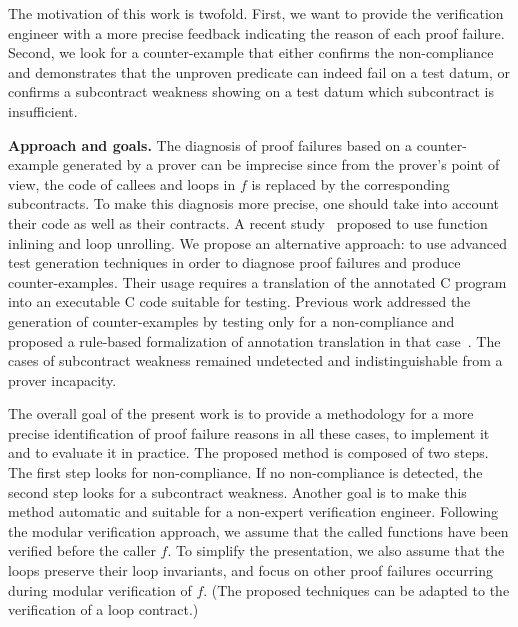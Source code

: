 \documentclass[web]{frama-c-book}
\begin{document}
The motivation of this work is twofold. First, we want to provide the
verification engineer with a more precise feedback indicating the reason of each
proof failure. Second, we look for a counter-example that either confirms the
non-compliance and demonstrates that the unproven predicate can indeed fail on a
test datum, or confirms a subcontract weakness
showing on a test datum which subcontract is insufficient.

\textbf{Approach and goals.}
The diagnosis of proof failures 
based on a counter-example generated by a prover can be imprecise
since from the prover's point of view,
the code of callees and loops in $f$ is replaced by the corresponding
subcontracts.
To make this diagnosis more precise, one should  
take into account their code as well as their contracts.
A recent study~\cite{Tschannen/14} proposed to use function inlining and loop unrolling.
We propose an alternative approach: to
use advanced test generation techniques in order to diagnose 
proof failures and produce counter-examples.
Their usage requires a translation of the annotated
C program
into an executable C code suitable for testing.
Previous work
addressed the generation of counter-examples by testing only for a
non-compli\-ance \cite{Petiot/TAP14} and proposed a rule-based formalization of
annotation translation
in that case~\cite{Petiot/SCAM14}.
The cases of subcontract weakness remained undetected and indistinguishable from
a prover incapacity.

The overall goal of the present work is to provide a methodology for a more
precise  identification of proof failure reasons in all these cases, to
implement it and to evaluate it in practice.
The proposed method is composed of two steps. The first step looks for
non-compliance. If no non-compliance is detected, the second step looks for a
subcontract weakness.
Another goal is to make this method automatic and suitable for a non-expert verification
engineer.
Following the modular verification approach,
we assume that the called functions have been verified before the caller $f$.
To simplify the presentation, we also assume that 
the loops preserve their loop invariants, and focus
on other proof failures occurring during modular verification of $f$. 
(The proposed techniques can be adapted to the verification of a loop contract.)
\end{document}
